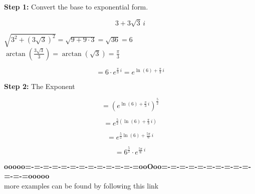 \documentclass{ximera}
\begin{document}
\textbf{\textcolor{blue!55!black}{Step 1:}} Convert the base to exponential form.


\[
3 + 3\sqrt{3} \, i
\]


$\sqrt{3^2 + (3\sqrt{3})^2} = \sqrt{9 + 9 \cdot 3} = \sqrt{36} = 6$ \\

$\arctan\left( \frac{3\sqrt{3}}{3}  \right) = \arctan\left( \sqrt{3}  \right) = \frac{\pi}{3}$



\[
= 6 \cdot e^{\tfrac{\pi}{3} \, i} = e^{\ln(6) + \tfrac{\pi}{3} \, i}
\]



\textbf{\textcolor{blue!55!black}{Step 2:}} The Exponent



\[
= \left( e^{\ln(6) + \tfrac{\pi}{3} \, i} \right)^{\tfrac{5}{2}} 
\]


\[
= e^{\tfrac{5}{2} (\ln(6) + \tfrac{\pi}{3} \, i)}
\]



\[
= e^{\tfrac{5}{2} \ln(6) + \tfrac{5\pi}{6} \, i}
\]


\[
= 6^{\tfrac{5}{2}} \cdot e^{\tfrac{5\pi}{6} \, i}
\]









\begin{center}
\textbf{\textcolor{green!50!black}{ooooo=-=-=-=-=-=-=-=-=-=-=-=-=ooOoo=-=-=-=-=-=-=-=-=-=-=-=-=ooooo}} \\

more examples can be found by following this link\\ 

\end{center}
\end{document}
